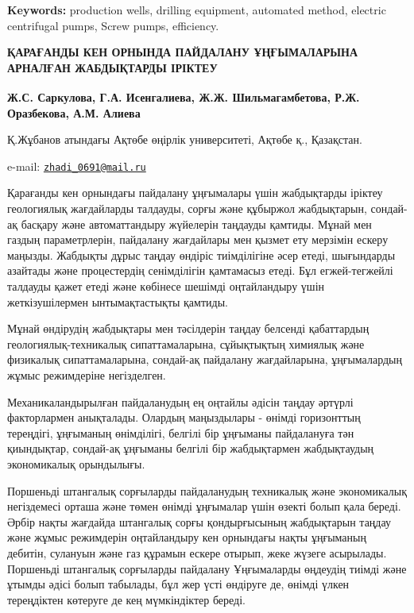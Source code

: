 {\bfseries Keywords:} production wells, drilling equipment, automated
method, electric centrifugal pumps, Screw pumps, efficiency.

\begin{articleheader}
{\bfseries ҚАРАҒАНДЫ КЕН ОРНЫНДА ПАЙДАЛАНУ ҰҢҒЫМАЛАРЫНА АРНАЛҒАН
ЖАБДЫҚТАРДЫ ІРІКТЕУ}

{\bfseries
Ж.С. Саркулова\textsuperscript{\envelope },
Г.А. Исенгалиева,
Ж.Ж. Шильмагамбетова,
Р.Ж. Оразбекова,
А.М. Алиева
}
\end{articleheader}

\begin{affiliation}
Қ.Жұбанов атындағы Ақтөбе өңірлік университеті, Ақтөбе қ., Қазақстан.

e-mail: \href{mailto:zhadi_0691@mail.ru}{\nolinkurl{zhadi\_0691@mail.ru}}
\end{affiliation}

Қарағанды кен орнындағы пайдалану ұңғымалары үшін жабдықтарды іріктеу
геологиялық жағдайларды талдауды, сорғы және құбыржол жабдықтарын,
сондай-ақ басқару және автоматтандыру жүйелерін таңдауды қамтиды. Мұнай
мен газдың параметрлерін, пайдалану жағдайлары мен қызмет ету мерзімін
ескеру маңызды. Жабдықты дұрыс таңдау өндіріс тиімділігіне әсер етеді,
шығындарды азайтады және процестердің сенімділігін қамтамасыз етеді. Бұл
егжей-тегжейлі талдауды қажет етеді және көбінесе шешімді оңтайландыру
үшін жеткізушілермен ынтымақтастықты қамтиды.

Мұнай өндірудің жабдықтары мен тәсілдерін таңдау белсенді қабаттардың
геологиялық-техникалық сипаттамаларына, сұйықтықтың химиялық және
физикалық сипаттамаларына, сондай-ақ пайдалану жағдайларына,
ұңғымалардың жұмыс режимдеріне негізделген.

Механикаландырылған пайдаланудың ең оңтайлы әдісін таңдау әртүрлі
факторлармен анықталады. Олардың маңыздылары - өнімді горизонттың
тереңдігі, ұңғыманың өнімділігі, белгілі бір ұңғыманы пайдалануға тән
қиындықтар, сондай-ақ ұңғыманы белгілі бір жабдықтармен жабдықтаудың
экономикалық орындылығы.

Поршеньді штангалық сорғыларды пайдаланудың техникалық және экономикалық
негіздемесі орташа және төмен өнімді ұңғымалар үшін өзекті болып қала
береді. Әрбір нақты жағдайда штангалық сорғы қондырғысының жабдықтарын
таңдау және жұмыс режимдерін оңтайландыру кен орнындағы нақты ұңғыманың
дебитін, сулануын және газ құрамын ескере отырып, жеке жүзеге асырылады.
Поршеньді штангалық сорғыларды пайдалану Ұңғымаларды өңдеудің тиімді
және ұтымды әдісі болып табылады, бұл жер үсті өндіруге де, өнімді үлкен
тереңдіктен көтеруге де кең мүмкіндіктер береді.

